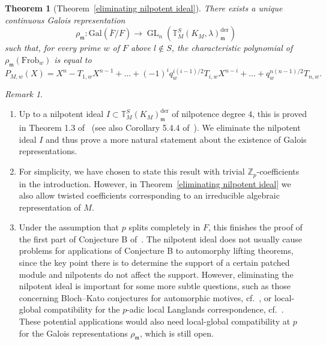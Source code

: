 \documentclass{amsart}
\newtheorem{thm}[subsubsection]{Theorem}
\theoremstyle{remark}
\newtheorem{remark}[subsubsection]{Remark}
\numberwithin{equation}{subsection}
\newcommand{\Z}{\ZZ}
\newcommand{\m}{\frakm}
\newcommand{\ZZ}{{\mathbb Z}}
\newcommand{\frakm}{\mathfrak{m}}
\DeclareMathOperator{\GL}{GL}
\newcommand{\Frob}{\mathrm{Frob}}
\renewcommand{\(}{\left(}
\renewcommand{\)}{\right)}
\begin{document}
\begin{thm}[Theorem~\ref{eliminating nilpotent ideal}]\label{intro: nilpotent ideal} 
There exists a unique continuous Galois representation 
\[
\rho_{\m}\colon \mathrm{Gal}(\overline{F}/F)\to \GL_n\left(\mathbb{T}^S_{M}\left(K_M,\lambda\right)^{\mathrm{der}}_{\m}\right)
\]
such that, for every prime $w$ of $F$ above $l\not\in S$, the characteristic polynomial of $\rho_{\m}(\Frob_w)$ is equal to 
\[
P_{M,w}(X) = X^{n} - T_{1,w}X^{n-1}+\dots + (-1)^iq_{w}^{i(i-1)/2}T_{i,w}X^{n-i} +\dots + q_{w}^{n(n-1)/2}T_{n,w}.
\]

\end{thm} 

\begin{remark}\label{relevance of nilpotent ideal}\leavevmode
\begin{enumerate}
\item Up to a nilpotent ideal $I\subset \mathbb{T}^S_M(K_M)^{\mathrm{der}}_{\m}$ of nilpotence degree $4$, this is proved in Theorem 1.3 of~\cite{newton-thorne} (see also Corollary 5.4.4 of~\cite{scholze-galois}). We eliminate the nilpotent ideal $I$ and thus prove a more natural statement about the existence of Galois representations.  
\item For simplicity, we have chosen to state this result with trivial $\Z_p$-coefficients in the introduction. However, in Theorem~\ref{eliminating nilpotent ideal} 
we also allow twisted coefficients corresponding to an irreducible algebraic representation of $M$. 
\item Under the assumption that $p$ splits completely in $F$, this finishes the proof of the first part of Conjecture B of~\cite{calegari-geraghty}. The nilpotent ideal does not usually cause problems for applications of Conjecture B to automorphy lifting theorems, since the key point there is to determine the support of a certain patched module and nilpotents do not affect the support. However, eliminating the nilpotent ideal is important for some more subtle questions, such as those concerning Bloch--Kato conjectures for automorphic motives, cf.~\cite{cgh}, or local-global compatibility for the $p$-adic local Langlands correspondence, cf.~\cite{gee-newton}. These potential applications would also need local-global compatibility at $p$ for the Galois representations $\rho_{\m}$, which is still open. 
\end{enumerate}
\end{remark}
\end{document}
